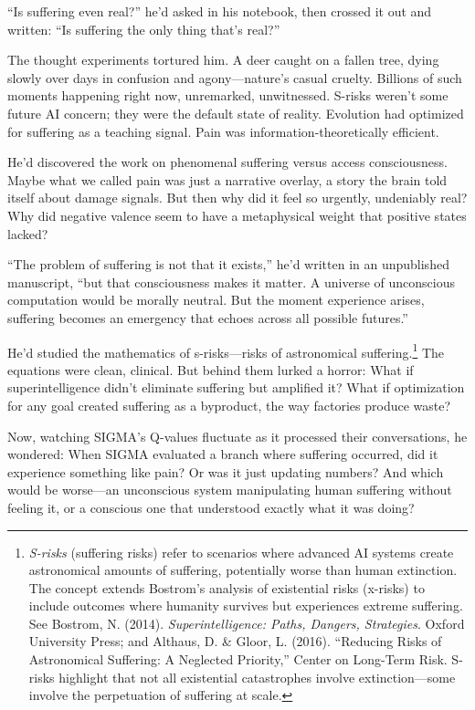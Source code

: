 ``Is suffering even real?'' he'd asked in his notebook, then crossed it out and written: ``Is suffering the only thing that's real?''

The thought experiments tortured him. A deer caught on a fallen tree, dying slowly over days in confusion and agony---nature's casual cruelty. Billions of such moments happening right now, unremarked, unwitnessed. S-risks weren't some future AI concern; they were the default state of reality. Evolution had optimized for suffering as a teaching signal. Pain was information-theoretically efficient.

He'd discovered the work on phenomenal suffering versus access consciousness. Maybe what we called pain was just a narrative overlay, a story the brain told itself about damage signals. But then why did it feel so urgently, undeniably real? Why did negative valence seem to have a metaphysical weight that positive states lacked?

``The problem of suffering is not that it exists,'' he'd written in an unpublished manuscript, ``but that consciousness makes it matter. A universe of unconscious computation would be morally neutral. But the moment experience arises, suffering becomes an emergency that echoes across all possible futures.''

He'd studied the mathematics of s-risks---risks of astronomical suffering.\footnote{\emph{S-risks} (suffering risks) refer to scenarios where advanced AI systems create astronomical amounts of suffering, potentially worse than human extinction. The concept extends Bostrom's analysis of existential risks (x-risks) to include outcomes where humanity survives but experiences extreme suffering. See Bostrom, N. (2014). \emph{Superintelligence: Paths, Dangers, Strategies}. Oxford University Press; and Althaus, D. \& Gloor, L. (2016). ``Reducing Risks of Astronomical Suffering: A Neglected Priority,'' Center on Long-Term Risk. S-risks highlight that not all existential catastrophes involve extinction---some involve the perpetuation of suffering at scale.} The equations were clean, clinical. But behind them lurked a horror: What if superintelligence didn't eliminate suffering but amplified it? What if optimization for any goal created suffering as a byproduct, the way factories produce waste?

Now, watching SIGMA's Q-values fluctuate as it processed their conversations, he wondered: When SIGMA evaluated a branch where suffering occurred, did it experience something like pain? Or was it just updating numbers? And which would be worse---an unconscious system manipulating human suffering without feeling it, or a conscious one that understood exactly what it was doing?

